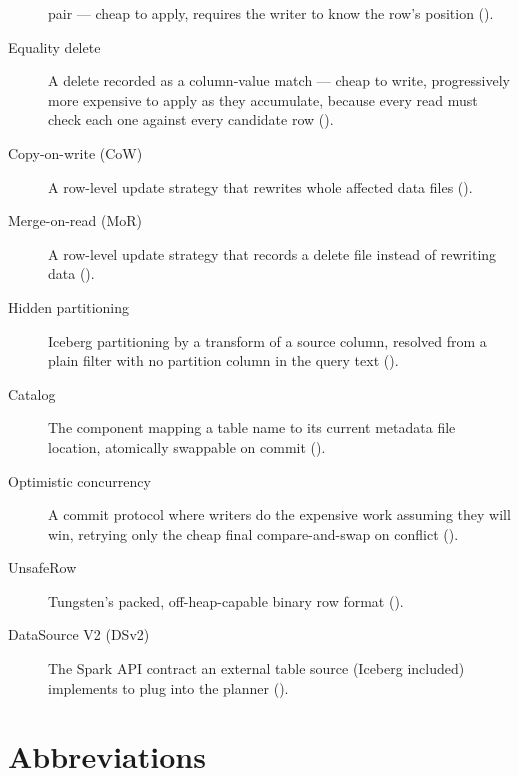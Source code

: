 \begin{description}
      pair --- cheap to apply, requires the writer to know the row's
      position ().
\item[Equality delete] A delete recorded as a column-value match --- cheap
      to write, progressively more expensive to apply as they accumulate,
      because every read must check each one against every candidate row
      ().
\item[Copy-on-write (CoW)] A row-level update strategy that rewrites whole
      affected data files ().
\item[Merge-on-read (MoR)] A row-level update strategy that records a delete
      file instead of rewriting data ().
\item[Hidden partitioning] Iceberg partitioning by a transform of a source
      column, resolved from a plain filter with no partition column in the
      query text ().
\item[Catalog] The component mapping a table name to its current metadata
      file location, atomically swappable on commit
      ().
\item[Optimistic concurrency] A commit protocol where writers do the
      expensive work assuming they will win, retrying only the cheap
      final compare-and-swap on conflict ().
\item[UnsafeRow] Tungsten's packed, off-heap-capable binary row format
      ().
\item[DataSource V2 (DSv2)] The Spark API contract an external table
      source (Iceberg included) implements to plug into the planner
      ().
\end{description}

\section*{Abbreviations}

